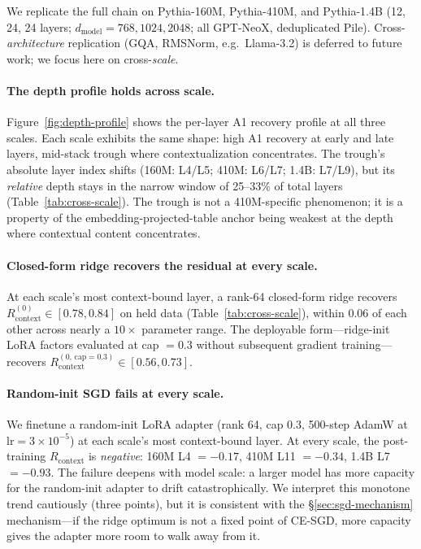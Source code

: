 We replicate the full chain on Pythia-160M, Pythia-410M, and Pythia-1.4B
(12, 24, 24 layers; $d_\mathrm{model} = 768, 1024, 2048$; all
GPT-NeoX, deduplicated Pile). Cross-\emph{architecture} replication
(GQA, RMSNorm, e.g.\ Llama-3.2) is deferred to future work; we focus
here on cross-\emph{scale}.

\paragraph{The depth profile holds across scale.} Figure~\ref{fig:depth-profile}
shows the per-layer A1 recovery profile at all three scales. Each scale
exhibits the same shape: high A1 recovery at early and late layers,
mid-stack trough where contextualization concentrates. The trough's
absolute layer index shifts (160M: L4/L5; 410M: L6/L7; 1.4B: L7/L9),
but its \emph{relative} depth stays in the narrow window of 25--33\%
of total layers (Table~\ref{tab:cross-scale}). The trough is not a
410M-specific phenomenon; it is a property of the
embedding-projected-table anchor being weakest at the depth where
contextual content concentrates.

\paragraph{Closed-form ridge recovers the residual at every scale.}
At each scale's most context-bound layer, a rank-64 closed-form ridge
recovers $R^{(0)}_\mathrm{context} \in [0.78, 0.84]$ on held data
(Table~\ref{tab:cross-scale}), within 0.06 of each other across nearly
a $10\times$ parameter range. The deployable form---ridge-init LoRA
factors evaluated at cap $=0.3$ without subsequent gradient
training---recovers $R^{(0,\,\mathrm{cap}=0.3)}_\mathrm{context}
\in [0.56, 0.73]$.

\paragraph{Random-init SGD fails at every scale.}
We finetune a random-init LoRA adapter (rank 64, cap 0.3, 500-step AdamW
at $\mathrm{lr}{=}3{\times}10^{-5}$) at each scale's most context-bound
layer. At every scale, the post-training $R_\mathrm{context}$ is
\emph{negative}: 160M L4 $= -0.17$, 410M L11 $= -0.34$, 1.4B L7
$= \mathbf{-0.93}$. The failure deepens with model scale: a larger
model has more capacity for the random-init adapter to drift
catastrophically. We interpret this monotone trend cautiously
(three points), but it is consistent with the §\ref{sec:sgd-mechanism}
mechanism---if the ridge optimum is not a fixed point of CE-SGD, more
capacity gives the adapter more room to walk away from it.

